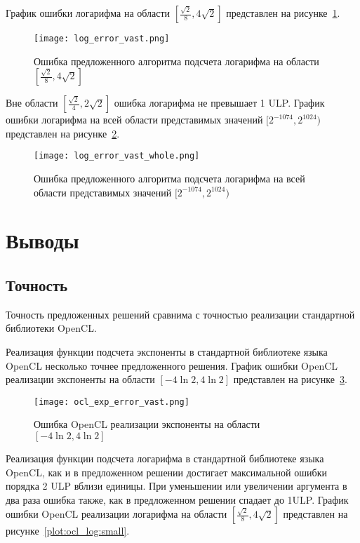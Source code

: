 График ошибки логарифма на области $[\frac{\sqrt{2}}{8}, 4\sqrt{2}]$ представлен на рисунке~\ref{plot:log:small}.

\begin{figure}[hbt]
    \centering
    \texttt{[image: log\_error\_vast.png]}
    \caption{Ошибка предложенного алгоритма подсчета логарифма на области $[\frac{\sqrt{2}}{8}, 4\sqrt{2}]$}
    \label{plot:log:small}
\end{figure}

Вне области $[\frac{\sqrt{2}}{4}, 2\sqrt{2}]$ ошибка логарифма не превышает 1 ULP.
График ошибки логарифма на всей области представимых значений $[2^{-1074}, 2^{1024})$ представлен на рисунке~\ref{plot:log:whole}.

\begin{figure}[hbt]
    \centering
    \texttt{[image: log\_error\_vast\_whole.png]}
    \caption{Ошибка предложенного алгоритма подсчета логарифма на всей области представимых значений $[2^{-1074}, 2^{1024})$}
    \label{plot:log:whole}
\end{figure}


\section{Выводы}

\subsection{Точность}

Точность предложенных решений сравнима с точностью реализации стандартной библиотеки OpenCL.

Реализация функции подсчета экспоненты в стандартной библиотеке языка OpenCL несколько точнее предложенного решения.
График ошибки OpenCL реализации экспоненты на области $[-4\ln{2}, 4\ln{2}]$ представлен на рисунке~\ref{plot:ocl_exp:small}.


\begin{figure}[hbt]
    \centering
    \texttt{[image: ocl\_exp\_error\_vast.png]}
    \caption{Ошибка OpenCL реализации экспоненты на области $[-4\ln{2}, 4\ln{2}]$}
    \label{plot:ocl_exp:small}
\end{figure}

Реализация функции подсчета логарифма в стандартной библиотеке языка OpenCL, как и в предложенном решении достигает максимальной ошибки порядка 2 ULP вблизи единицы.
При уменьшении или увеличении аргумента в два раза ошибка также, как в предложенном решении спадает до 1ULP.
График ошибки OpenCL реализации логарифма на области $[\frac{\sqrt{2}}{8}, 4\sqrt{2}]$ представлен на рисунке~\ref{plot:ocl_log:small}.


